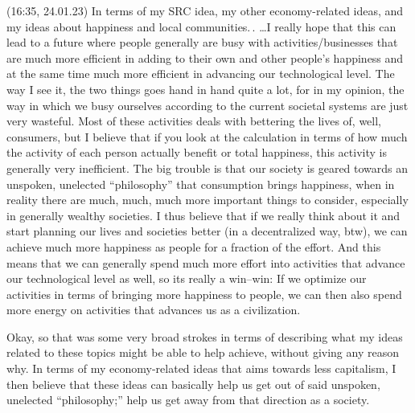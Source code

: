 \documentclass{report}
\begin{document}
(16:35, 24.01.23) In terms of my SRC idea, my other economy-related ideas, and my ideas about happiness and local communities.\,. %
\ldots I really hope that this can lead to a future where people generally are busy with activities/businesses that are much more efficient in adding to their own and other people's happiness and at the same time much more efficient in advancing our technological level. The way I see it, the two things goes hand in hand quite a lot, for in my opinion, the way in which we busy ourselves according to the current societal systems are just very wasteful. Most of these activities deals with bettering the lives of, well, consumers, but I believe that if you look at the calculation in terms of how much the activity of each person actually benefit or total happiness, this activity is generally very inefficient. The big trouble is that our society is geared towards an unspoken, unelected ``philosophy'' that consumption brings happiness, when in reality there are much, much, much more important things to consider, especially in generally wealthy societies. I thus believe that if we really think about it and start planning our lives and societies better (in a decentralized way, btw), we can achieve much more happiness as people for a fraction of the effort. And this means that we can generally spend much more effort into activities that advance our technological level as well, so its really a win--win: If we optimize our activities in terms of bringing more happiness to people, we can then also spend more energy on activities that advances us as a civilization.

Okay, so that was some very broad strokes in terms of describing what my ideas related to these topics might be able to help achieve, without giving any reason why. In terms of my economy-related ideas that aims towards less capitalism, I then believe that these ideas can basically help us get out of said unspoken, unelected ``philosophy;'' help us get away from that direction as a society. 
\end{document}
